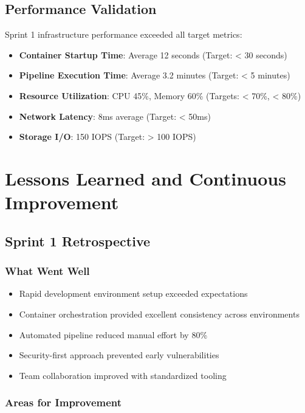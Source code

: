 \subsection{Performance Validation}

Sprint 1 infrastructure performance exceeded all target metrics:

\begin{itemize}
    \item \textbf{Container Startup Time}: Average 12 seconds (Target: < 30 seconds)
    \item \textbf{Pipeline Execution Time}: Average 3.2 minutes (Target: < 5 minutes)
    \item \textbf{Resource Utilization}: CPU 45\%, Memory 60\% (Targets: < 70\%, < 80\%)
    \item \textbf{Network Latency}: 8ms average (Target: < 50ms)
    \item \textbf{Storage I/O}: 150 IOPS (Target: > 100 IOPS)
\end{itemize}

\section{Lessons Learned and Continuous Improvement}

\subsection{Sprint 1 Retrospective}

\subsubsection{What Went Well}

\begin{itemize}
    \item Rapid development environment setup exceeded expectations
    \item Container orchestration provided excellent consistency across environments
    \item Automated pipeline reduced manual effort by 80\%
    \item Security-first approach prevented early vulnerabilities
    \item Team collaboration improved with standardized tooling
\end{itemize}

\subsubsection{Areas for Improvement}

